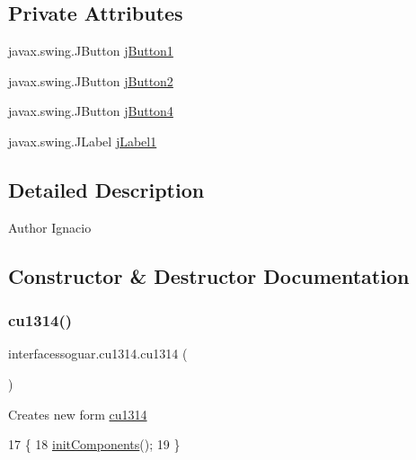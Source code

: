 \subsection*{Private Attributes}
\begin{DoxyCompactItemize}
\item 
javax.\+swing.\+J\+Button \mbox{\hyperlink{classinterfacessoguar_1_1cu1314_a604ecb1ce37ecd98c2325309ac0aea23}{j\+Button1}}
\item 
javax.\+swing.\+J\+Button \mbox{\hyperlink{classinterfacessoguar_1_1cu1314_ac2c3897829fe6bdfbec2d57df61549bf}{j\+Button2}}
\item 
javax.\+swing.\+J\+Button \mbox{\hyperlink{classinterfacessoguar_1_1cu1314_abd74ab1c366767481493ee8d70c7e779}{j\+Button4}}
\item 
javax.\+swing.\+J\+Label \mbox{\hyperlink{classinterfacessoguar_1_1cu1314_ababc8bdd3ad91398cdd0c7444b230996}{j\+Label1}}
\end{DoxyCompactItemize}


\subsection{Detailed Description}
\begin{DoxyAuthor}{Author}
Ignacio 
\end{DoxyAuthor}


\subsection{Constructor \& Destructor Documentation}
\mbox{\label{classinterfacessoguar_1_1cu1314_a96829fa8e13831c1c9be1e7573fcc7da}} 
\subsubsection{\texorpdfstring{cu1314()}{cu1314()}}
{\footnotesize\ttfamily interfacessoguar.\+cu1314.\+cu1314 (\begin{DoxyParamCaption}{ }\end{DoxyParamCaption})\hspace{0.3cm}{\ttfamily [inline]}}

Creates new form \mbox{\hyperlink{classinterfacessoguar_1_1cu1314}{cu1314}} 
\begin{DoxyCode}
17                     \{
18         \mbox{\hyperlink{classinterfacessoguar_1_1cu1314_a8601e51a52b5a57003a1d122c904b4b9}{initComponents}}();
19     \}
\end{DoxyCode}


